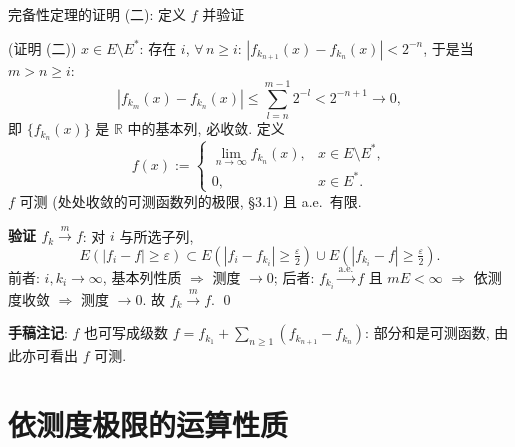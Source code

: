 
\begin{frame}{完备性定理的证明 (二): 定义 $f$ 并验证}

\startproof[bg=yellow, fg=red](证明 (二))
$x \in E \setminus E^*$: 存在 $i$, $\forall\, n \geqslant i$: $|f_{k_{n+1}}(x) - f_{k_n}(x)| < 2^{-n}$, 于是当 $m > n \geqslant i$:
\[
|f_{k_m}(x) - f_{k_n}(x)|
\leqslant \sum_{l=n}^{m-1} 2^{-l} < 2^{-n+1} \longrightarrow 0,
\]
即 $\{f_{k_n}(x)\}$ 是 $\mathbb{R}$ 中的基本列, 必收敛. 定义
\[
f(x) := \begin{cases}
\lim\limits_{n\to\infty} f_{k_n}(x), & x \in E \setminus E^*,\\[0.4em]
0, & x \in E^* .
\end{cases}
\]
$f$ 可测 (处处收敛的可测函数列的极限, \S 3.1) 且 a.e.\ 有限.

\pause

\textbf{验证 $f_k \xrightarrow{m} f$}: 对 $i$ 与所选子列,
\[
E(|f_i - f| \geqslant \varepsilon)
\subset E(|f_i - f_{k_i}| \geqslant \tfrac{\varepsilon}{2})
\cup E(|f_{k_i} - f| \geqslant \tfrac{\varepsilon}{2}).
\]
前者: $i, k_i \to \infty$, 基本列性质 $\Rightarrow$ 测度 $\to 0$; 后者: $f_{k_i} \xrightarrow{\text{a.e.}} f$ 且 $mE < \infty$ $\Rightarrow$ 依测度收敛 $\Rightarrow$ 测度 $\to 0$. 故 $f_k \xrightarrow{m} f$.
\qed

\pause

\textbf{手稿注记}: $f$ 也可写成级数 $f = f_{k_1} + \sum_{n \geqslant 1} (f_{k_{n+1}} - f_{k_n})$: 部分和是可测函数, 由此亦可看出 $f$ 可测.

\end{frame}


\section[运算性质]{依测度极限的运算性质}


